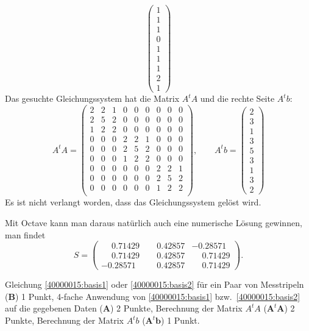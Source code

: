 \begin{loesung}
\[\begin{pmatrix}
1\\1\\1\\
0\\1\\1\\
1\\2\\1
\end{pmatrix}
\]
Das gesuchte Gleichungssystem hat die Matrix $A^tA$ und die rechte
Seite $A^tb$:
\[
A^tA
=
\begin{pmatrix}
2&2&1&0&0&0&0&0&0\\
2&5&2&0&0&0&0&0&0\\
1&2&2&0&0&0&0&0&0\\
%
0&0&0&2&2&1&0&0&0\\
0&0&0&2&5&2&0&0&0\\
0&0&0&1&2&2&0&0&0\\
%
0&0&0&0&0&0&2&2&1\\
0&0&0&0&0&0&2&5&2\\
0&0&0&0&0&0&1&2&2\\
\end{pmatrix}
,\qquad
A^tb=\begin{pmatrix}2\\3\\1\\3\\5\\3\\1\\3\\2\end{pmatrix}
\]
Es ist nicht verlangt worden, dass das Gleichungssystem gelöst wird.
\end{loesung}

\begin{diskussion}
Mit Octave kann man daraus natürlich auch eine numerische Lösung gewinnen,
man findet
\[
S=\begin{pmatrix}
\phantom{-}0.71429& \phantom{-}0.42857&           -0.28571\\
\phantom{-}0.71429& \phantom{-}0.42857& \phantom{-}0.71429\\
          -0.28571& \phantom{-}0.42857& \phantom{-}0.71429
\end{pmatrix}.
\]
\end{diskussion}

\begin{bewertung}
Gleichung \eqref{40000015:basis1} oder \eqref{40000015:basis2}
für ein Paar von Messtripeln ({\bf B})
1 Punkt,
4-fache Anwendung von \eqref{40000015:basis1} bzw.~\eqref{40000015:basis2} auf die gegebenen Daten ({\bf A})
2 Punkte,
Berechnung der Matrix $A^tA$ ($\textbf{A}^t\textbf{A}$) 2 Punkte,
Berechnung der Matrix $A^tb$ ($\textbf{A}^t\textbf{b}$) 1 Punkt.

\end{bewertung}


